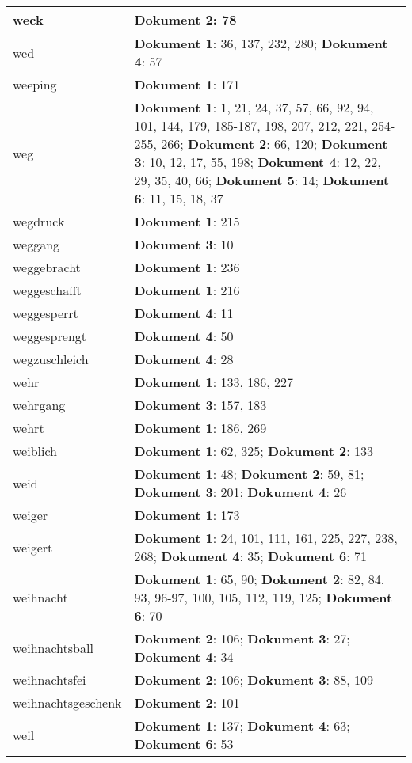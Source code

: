 \documentclass[a5paper]{article}
\begin{document}
\begin{longtable}[l]{|l|p{3in}|}
\hline
weck & \textbf{Dokument 2}: 78 \\
\hline
wed & \textbf{Dokument 1}: 36, 137, 232, 280; \textbf{Dokument 4}: 57 \\
\hline
weeping & \textbf{Dokument 1}: 171 \\
\hline
weg & \textbf{Dokument 1}: 1, 21, 24, 37, 57, 66, 92, 94, 101, 144, 179, 185-187, 198, 207, 212, 221, 254-255, 266; \textbf{Dokument 2}: 66, 120; \textbf{Dokument 3}: 10, 12, 17, 55, 198; \textbf{Dokument 4}: 12, 22, 29, 35, 40, 66; \textbf{Dokument 5}: 14; \textbf{Dokument 6}: 11, 15, 18, 37 \\
\hline
wegdruck & \textbf{Dokument 1}: 215 \\
\hline
weggang & \textbf{Dokument 3}: 10 \\
\hline
weggebracht & \textbf{Dokument 1}: 236 \\
\hline
weggeschafft & \textbf{Dokument 1}: 216 \\
\hline
weggesperrt & \textbf{Dokument 4}: 11 \\
\hline
weggesprengt & \textbf{Dokument 4}: 50 \\
\hline
wegzuschleich & \textbf{Dokument 4}: 28 \\
\hline
wehr & \textbf{Dokument 1}: 133, 186, 227 \\
\hline
wehrgang & \textbf{Dokument 3}: 157, 183 \\
\hline
wehrt & \textbf{Dokument 1}: 186, 269 \\
\hline
weiblich & \textbf{Dokument 1}: 62, 325; \textbf{Dokument 2}: 133 \\
\hline
weid & \textbf{Dokument 1}: 48; \textbf{Dokument 2}: 59, 81; \textbf{Dokument 3}: 201; \textbf{Dokument 4}: 26 \\
\hline
weiger & \textbf{Dokument 1}: 173 \\
\hline
weigert & \textbf{Dokument 1}: 24, 101, 111, 161, 225, 227, 238, 268; \textbf{Dokument 4}: 35; \textbf{Dokument 6}: 71 \\
\hline
weihnacht & \textbf{Dokument 1}: 65, 90; \textbf{Dokument 2}: 82, 84, 93, 96-97, 100, 105, 112, 119, 125; \textbf{Dokument 6}: 70 \\
\hline
weihnachtsball & \textbf{Dokument 2}: 106; \textbf{Dokument 3}: 27; \textbf{Dokument 4}: 34 \\
\hline
weihnachtsfei & \textbf{Dokument 2}: 106; \textbf{Dokument 3}: 88, 109 \\
\hline
weihnachtsgeschenk & \textbf{Dokument 2}: 101 \\
\hline
weil & \textbf{Dokument 1}: 137; \textbf{Dokument 4}: 63; \textbf{Dokument 6}: 53 \\

\end{longtable}
\end{document}

